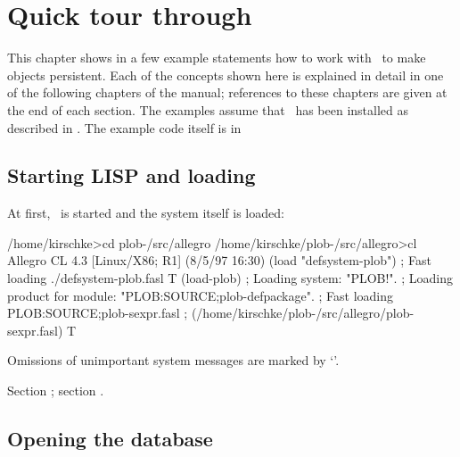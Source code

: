 %

\chapter[Quick tour through PLOB]%
{Quick tour through \protect\plob}

This chapter shows in a few example statements how to work with \plob\ 
to make objects persistent. Each of the concepts shown here is
explained in detail in one of the following chapters of the manual;
references to these chapters are given at the end of each section. The
examples assume that \plob\ has been installed as described in
\cite{bib:PLOB-install}. The example code itself is in

\section[Starting LISP and loading PLOB]%
{Starting LISP and loading \protect\plob}%
\label{sec:QuickTourStart}

At first, \allegrocl\ is started and the system itself is loaded:
\begin{CompactCode}
/home/kirschke>cd plob-\thisversion/src/allegro
/home/kirschke/plob-\thisversion/src/allegro>cl
Allegro CL 4.3 [Linux/X86; R1] (8/5/97 16:30)
\OmitUnimportant
\listener{}(load "defsystem-plob")
; Fast loading ./defsystem-plob.fasl
T
\listener{}(load-plob)
; Loading system: "PLOB!".
;   Loading product for module: "PLOB:SOURCE;plob-defpackage".
\OmitUnimportant
; Fast loading PLOB:SOURCE;plob-sexpr.fasl
;    (/home/kirschke/plob-\thisversion/src/allegro/plob-sexpr.fasl)
T
\end{CompactCode}

Omissions of unimportant system messages are marked by
`\OmitUnimportant'.

 Section ; section \fcite{bootstrap
  ...}.

\section{Opening the database}

